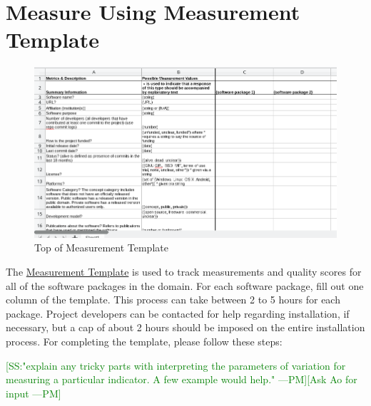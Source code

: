 \documentclass[letterpaper,cleveref]{lipics-v2019}
\newcommand{\authornote}[3]{\textcolor{#1}{[#3 ---#2]}}
\newcommand{\authornote}[3]{}
\newcommand{\pmi}[1]{\authornote{green}{PM}{#1}} %
\theoremstyle{definition}
\begin{document}
\section{Measure Using Measurement Template} \label{SecShallowMeasure}

\begin{figure}[h!]
	\begin{center}
		\includegraphics[width=1.0\textwidth]{measurement_template}
		\caption{Top of Measurement Template}
		\label{measurement_template_image}

	\end{center}
\end{figure}

The \href{run:Combined_MeasurementTemplate_EmpiricalMeasures.xlsx}{Measurement Template} is used to track measurements and quality scores for all of the software packages in the domain. For each software package, fill out one column of the template. This process can take between 2 to 5 hours for each package.
Project developers can be contacted for help regarding installation, if necessary, but a cap of about 2 hours should be imposed on the entire installation process. For completing the template, please follow these steps:

\pmi{SS:"explain any tricky parts with interpreting the parameters of variation for measuring a particular indicator. A few example would help."}\pmi{Ask Ao for input}
\end{document}

